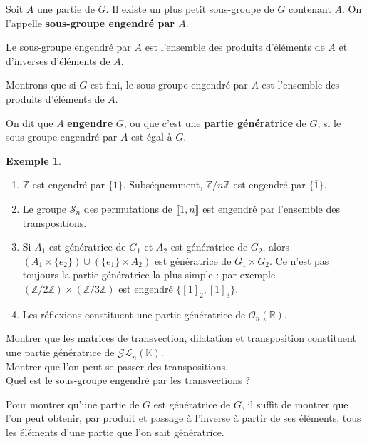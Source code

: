 \documentclass[french]{article}
\newcommand{\Z}{\mathbb{Z}}
\newcommand{\R}{\mathbb{R}}
\newcommand{\K}{\mathbb{K}}
\theoremstyle{plain}
\theoremstyle{definition}
\newtheorem*{ex}{Exemple}
\theoremstyle{remark}
\begin{document}
\begin{dfn}
	Soit $A$ une partie de $G$. Il existe un plus petit sous-groupe de $G$ contenant $A$. On l'appelle \textbf{sous-groupe engendré par $A$}.
\end{dfn}

\begin{prop}%
	Le sous-groupe engendré par $A$ est l'ensemble des produits d'éléments de $A$ et d'inverses d'éléments de $A$.
\end{prop}

\begin{exo}
	Montrons que si $G$ est fini, le sous-groupe engendré par $A$ est l'ensemble des produits d'éléments de $A$.
\end{exo}

\begin{dfn}
	On dit que $A$ \textbf{engendre} $G$, ou que c'est une \textbf{partie génératrice} de $G$, si le sous-groupe engendré par $A$ est égal à $G$.
\end{dfn}

\begin{ex}
	\begin{enumerate}
		\item $\Z$ est engendré par $\{1\}$. Subséquemment, $\Z/n\Z$ est engendré par $\{\overline{1}\}$.
		\item Le groupe $\mathcal{S}_n$ des permutations de $\llbracket1,n\rrbracket$ est engendré par l'ensemble des transpositions.
		\item Si $A_1$ est génératrice de $G_1$ et $A_2$ est génératrice de $G_2$, alors $(A_1\times\{e_2\})\cup(\{e_1\}\times A_2)$ est génératrice de $G_1\times G_2$. Ce n'est pas toujours la partie génératrice la plus simple : par exemple $(\Z/2\Z)\times(\Z/3\Z)$ est engendré $\{[1]_2,[1]_3\}$.
		\item Les réflexions constituent une partie génératrice de $\mathcal{O}_n(\R)$.
	\end{enumerate}
\end{ex}

\begin{exo}
	Montrer que les matrices de transvection, dilatation et transposition constituent une partie génératrice de $\mathcal{GL}_n(\K)$.\\
	Montrer que l'on peut se passer des transpositions.\\
	Quel est le sous-groupe engendré par les transvections ? %
\end{exo}

\begin{met}
	Pour montrer qu'une partie de $G$ est génératrice de $G$, il suffit de montrer que l'on peut obtenir, par produit et passage à l'inverse à partir de ses éléments, tous les éléments d'une partie que l'on sait génératrice.
\end{met}
\end{document}
